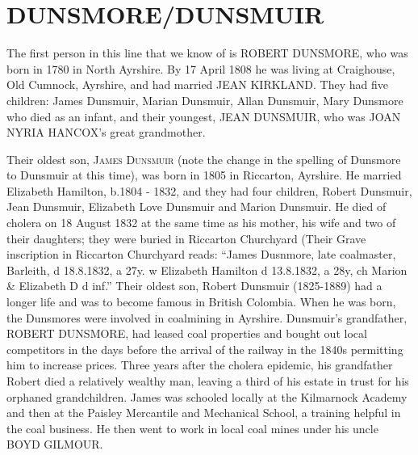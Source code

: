 \section{DUNSMORE/DUNSMUIR}

The first person in this line that we know of is \uppercase{Robert Dunsmore}, who was born in 1780 in North Ayrshire.  By	
17 April 1808 he was living at Craighouse, 	Old Cumnock, Ayrshire, and had married \uppercase{Jean Kirkland}.  They had five children: James Dunsmuir, Marian Dunsmuir, Allan Dunsmuir, Mary Dunsmore who died as an infant, and  their youngest, \uppercase{Jean Dunsmuir}, who was  \uppercase{Joan Nyria Hancox}'s great grandmother.

Their oldest son, \textsc{James Dunsmuir} (note the change in the spelling of Dunsmore to Dunsmuir at this time), was born in	1805 in Riccarton, Ayrshire. He married Elizabeth Hamilton, b.1804 - 1832, and they had four children, Robert Dunsmuir, Jean Dunsmuir, Elizabeth Love Dunsmuir and Marion Dunsmuir. He died of cholera on 18 August 1832 at the same time as his mother, his wife and two of their daughters; they were buried in Riccarton Churchyard (Their Grave inscription in Riccarton Churchyard reads: ``James Dusnmore, late coalmaster, Barleith, d 18.8.1832, a 27y. w Elizabeth Hamilton d 13.8.1832, a 28y, ch Marion \& Elizabeth D d inf.'' Their oldest son, Robert Dunsmuir (1825-1889) had a longer life and was to become famous in British Colombia.  When he was born, the Dunsmores were involved in coalmining in Ayrshire. Dunsmuir's grandfather, \uppercase{Robert Dunsmore}, had leased coal properties and bought out local competitors in the days before the arrival of the railway in the 1840s permitting him to increase prices.  Three years after the cholera epidemic, his grandfather Robert died a relatively wealthy man, leaving a third of his estate in trust for his orphaned grandchildren. James was schooled locally at the Kilmarnock Academy and then at the Paisley Mercantile and Mechanical School, a training helpful in the coal business. He then went to work in local coal mines under his uncle \uppercase{Boyd Gilmour}.
